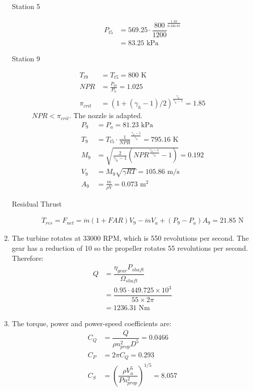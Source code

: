 \documentclass{article}
\begin{document}
\begin{enumerate}
\begin{description}
        \item[Station 5]
        \begin{align*}
            P_{t5} &= 569.25 \cdot \dfrac{800}{1200}^{\frac{1.33}{0.33\dot 0.85}}\\
            &= 83.25 \text{ kPa}
        \end{align*}

        \item[Station 9]
        \begin{align*}
            T_{t9} &= T_{t5} = 800\text{ K}\\
            NPR &= \frac{P_{t9}}{P_a} = 1.025 \\
            \pi_{crit} &= (1 + (\gamma_h - 1 )/2)^\frac{\gamma_h}{\gamma_h - 1} = 1.85
        \end{align*}
        $NPR < \pi_{crit}$. The nozzle is adapted.
        \begin{align*}
            P_9 &= P_a = 81.23 \text{ kPa}\\
            T_9 &= T_{t5}\cdot \frac{1}{NPR}^\frac{\gamma_h - 1}{\gamma_h} = 795.16 \text{ K} \\
            M_9 &= \sqrt{\frac{2}{\gamma_h - 1} \left( NPR ^\frac{\gamma_h - 1}{\gamma_h} - 1\right)} = 0.192 \\
            V_9 &= M_9 \sqrt{\gamma R T} = 105.86 \text{ m/s}\\
            A_9 &= \frac{\dot{m}}{\rho V} = 0.073 \text{ m}^2
        \end{align*}
        \item[Residual Thrust]
        \begin{align*}
            T_{res} = F_{net} = \dot{m}(1 + FAR)V_9 - \dot{m}V_a + (P_9 - P_a)A_9 = 21.85 \text{ N}
        \end{align*}
    \end{description}
    \item The turbine rotates at 33000 RPM, which is 550 revolutions per second. The gear has a reduction of 10 so the propeller rotates 55 revolutions per second. Therefore:
    \begin{align*}
        Q &= \dfrac{\eta_{gear} P_{shaft}}{\Omega_{shaft}}\\
        &= \dfrac{0.95 \cdot 449.725\times 10^3 }{55 \times 2\pi} \\
        &= 1236.31 \text{ Nm}
    \end{align*}

    \item The torque, power and power-speed coefficients are:
    \begin{align*}
        C_Q &= \dfrac{Q}{\rho n_{prop}^2 D^5} = 0.0466 \\ 
        C_P &= 2 \pi C_Q = 0.293 \\ 
        C_S &= \left(\dfrac{\rho V_a^5}{P n_{prop}^2}\right)^{1/5} = 8.057
    \end{align*}


\end{enumerate}
\end{document}
